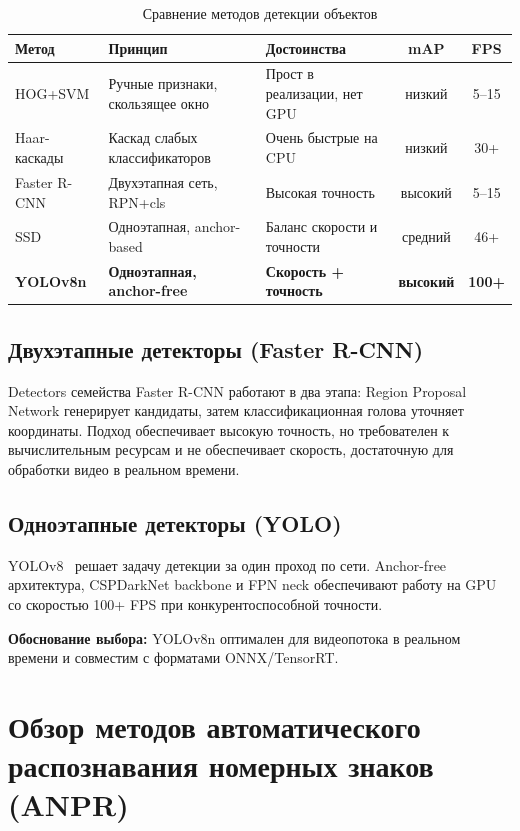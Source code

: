 \documentclass[14pt,a4paper]{report}
\numberwithin{equation}{chapter}
\numberwithin{figure}{chapter}
\numberwithin{table}{chapter}
\begin{document}
\begin{table}[H]
\centering
\caption{Сравнение методов детекции объектов}
\label{tab:detectors}
\begin{tabularx}{\textwidth}{lXXcc}
\toprule
\textbf{Метод} & \textbf{Принцип} & \textbf{Достоинства} & \textbf{mAP} & \textbf{FPS} \\
\midrule
HOG+SVM       & Ручные признаки, скользящее окно   & Прост в реализации, нет GPU  & низкий & 5--15 \\
Haar-каскады  & Каскад слабых классификаторов      & Очень быстрые на CPU          & низкий & 30+ \\
Faster R-CNN  & Двухэтапная сеть, RPN+cls          & Высокая точность              & высокий & 5--15 \\
SSD           & Одноэтапная, anchor-based          & Баланс скорости и точности    & средний & 46+ \\
\textbf{YOLOv8n} & \textbf{Одноэтапная, anchor-free} & \textbf{Скорость + точность} & \textbf{высокий} & \textbf{100+} \\
\bottomrule
\end{tabularx}
\end{table}

\subsection{Двухэтапные детекторы (Faster R-CNN)}

Detectors семейства Faster R-CNN работают в два этапа: Region Proposal Network
генерирует кандидаты, затем классификационная голова уточняет координаты.
Подход обеспечивает высокую точность, но требователен к вычислительным ресурсам
и не обеспечивает скорость, достаточную для обработки видео в реальном времени.

\subsection{Одноэтапные детекторы (YOLO)}

YOLOv8~\cite{survey2021} решает задачу детекции за один проход по сети.
Anchor-free архитектура, CSPDarkNet backbone и FPN neck обеспечивают
работу на GPU со скоростью 100+ FPS при конкурентоспособной точности.

\noindent\textbf{Обоснование выбора:} YOLOv8n оптимален для видеопотока
в реальном времени и совместим с форматами ONNX/TensorRT.

\section{Обзор методов автоматического распознавания номерных знаков (ANPR)}
\end{document}
